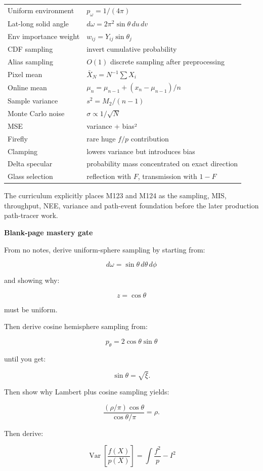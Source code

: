 {\begin{longtable}[]{@{}
  >{\raggedright\arraybackslash}p{}
  >{\raggedright\arraybackslash}p{}@{}}
Uniform environment & \(p_\omega=1/(4\pi)\) \\
Lat-long solid angle & \(d\omega=2\pi^2\sin\theta\,du\,dv\) \\
Env importance weight & \(w_{ij}=Y_{ij}\sin\theta_j\) \\
CDF sampling & invert cumulative probability \\
Alias sampling & \(O(1)\) discrete sampling after preprocessing \\
Pixel mean & \(\bar X_N=N^{-1}\sum X_i\) \\
Online mean & \(\mu_n=\mu_{n-1}+(x_n-\mu_{n-1})/n\) \\
Sample variance & \(s^2=M_2/(n-1)\) \\
Monte Carlo noise & \(\sigma\propto1/\sqrt N\) \\
MSE & variance + bias² \\
Firefly & rare huge \(f/p\) contribution \\
Clamping & lowers variance but introduces bias \\
Delta specular & probability mass concentrated on exact direction \\
Glass selection & reflection with \(F\), transmission with \(1-F\) \\
\end{longtable}
}

The curriculum explicitly places M123 and M124 as the sampling, MIS, throughput, NEE, variance and path-event foundation before the later production path-tracer work.

\textbf{Blank-page mastery gate}

From no notes, derive uniform-sphere sampling by starting from:

\[
d\omega=\sin\theta\,d\theta\,d\phi
\]

and showing why:

\[
z=\cos\theta
\]

must be uniform.

Then derive cosine hemisphere sampling from:

\[
p_\theta=2\cos\theta\sin\theta
\]

until you get:

\[
\sin\theta=\sqrt{\xi}.
\]

Then show why Lambert plus cosine sampling yields:

\[
\frac{
(\rho/\pi)\cos\theta
}{
\cos\theta/\pi
}
=
\rho.
\]

Then derive:

\[
\operatorname{Var}
\left[
\frac{f(X)}{p(X)}
\right]
=
\int\frac{f^2}{p}-I^2
\]

